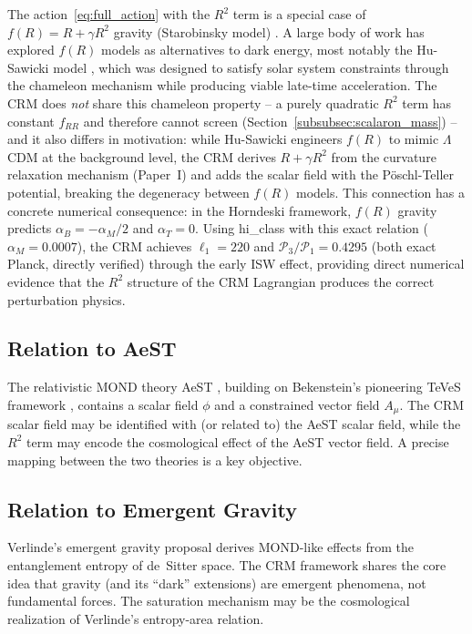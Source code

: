 \documentclass[aps,prd,twocolumn,superscriptaddress,nofootinbib]{revtex4-2}
\begin{document}
The action~\eqref{eq:full_action} with the $R^2$ term is a special case of $f(R) = R + \gamma R^2$ gravity (Starobinsky model) \cite{Starobinsky1980}. A large body of work has explored $f(R)$ models as alternatives to dark energy, most notably the Hu-Sawicki model \cite{HuSawicki2007}, which was designed to satisfy solar system constraints through the chameleon mechanism while producing viable late-time acceleration. The CRM does \textit{not} share this chameleon property -- a purely quadratic $R^2$ term has constant $f_{RR}$ and therefore cannot screen (Section~\ref{subsubsec:scalaron_mass}) -- and it also differs in motivation: while Hu-Sawicki engineers $f(R)$ to mimic $\Lambda$CDM at the background level, the CRM derives $R + \gamma R^2$ from the curvature relaxation mechanism (Paper~I) and adds the scalar field with the P\"oschl-Teller potential, breaking the degeneracy between $f(R)$ models. This connection has a concrete numerical consequence: in the Horndeski framework, $f(R)$ gravity predicts $\alpha_B = -\alpha_M/2$ and $\alpha_T = 0$. Using hi\_class \cite{Zumalacarregui2017} with this exact relation ($\alpha_M = 0.0007$), the CRM achieves $\ell_1 = 220$ and $\mathcal{P}_3/\mathcal{P}_1 = 0.4295$ (both exact Planck, directly verified) through the early ISW effect, providing direct numerical evidence that the $R^2$ structure of the CRM Lagrangian produces the correct perturbation physics.

\subsection{Relation to AeST}

The relativistic MOND theory AeST \cite{Skordis2021}, building on Bekenstein's pioneering TeVeS framework \cite{Bekenstein2004}, contains a scalar field $\phi$ and a constrained vector field $A_\mu$. The CRM scalar field may be identified with (or related to) the AeST scalar field, while the $R^2$ term may encode the cosmological effect of the AeST vector field. A precise mapping between the two theories is a key objective.

\subsection{Relation to Emergent Gravity}

Verlinde's emergent gravity proposal \cite{Verlinde2017} derives MOND-like effects from the entanglement entropy of de~Sitter space. The CRM framework shares the core idea that gravity (and its ``dark'' extensions) are emergent phenomena, not fundamental forces. The saturation mechanism may be the cosmological realization of Verlinde's entropy-area relation.
\end{document}
